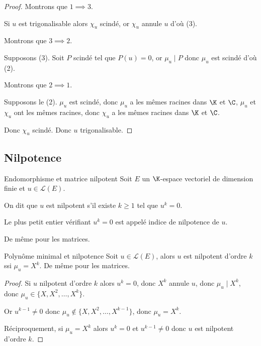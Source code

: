 \begin{proof}
    Montrons que $1 \implies 3$.
    
    Si $u$ est trigonalisable alors $\chi_u$ scindé, or $\chi_u$ annule $u$ d'où (3).

    \lvspace Montrons que $3 \implies 2$.
    
    Supposons (3). Soit $P$ scindé tel que $P(u) = 0$, or $\mu_u \mid P$ donc $\mu_u$ est scindé d'où (2).

    \lvspace Montrons que $2 \implies 1$.
    
    Supposons le (2). $\mu_u$ est scindé, donc $\mu_u$ a les mêmes racines dans $\K$ et $\C$, 
    $\mu_u$ et $\chi_u$ ont les mêmes racines, donc $\chi_u$ a les mêmes racines dans $\K$ et $\C$.

    Donc $\chi_u$ scindé. Donc $u$ trigonalisable. 
\end{proof}

\subsection{Nilpotence}

\begin{definition}{Endomorphisme et matrice nilpotent}{}
    Soit $E$ un $\K$-espace vectoriel de dimension finie et $u \in \mathscr L(E)$. 

    On dit que $u$ est nilpotent s'il existe $k \geqslant 1$ tel que $u^k = 0$.

    Le plus petit entier vérifiant $u^k = 0$ est appelé indice de nilpotence de $u$.
    
    De même pour les matrices. 
\end{definition}


\begin{proposition}{Polynôme minimal et nilpotence}{}
    Soit $u \in \mathscr L(E)$, alors $u$ est nilpotent d'ordre $k$ ssi $\mu_u = X^k$.
    De même pour les matrices.
\end{proposition}

\begin{proof}
    Si $u$ nilpotent d'ordre $k$ alors $u^k = 0$, donc $X^k$ annule $u$, 
    donc $\mu_u \mid X^k$, donc $\mu_u \in \{X, X^2, \ldots, X^k\}$.

    Or $u^{k - 1} \neq 0$ donc $\mu_u \notin \{X, X^2, \ldots, X^{k - 1}\}$, donc $\mu_u = X^k$.

    Réciproquement, si $\mu_u = X^k$ alors $u^k = 0$ et $u^{k - 1} \neq 0$ donc $u$ est nilpotent d'ordre $k$.
\end{proof}

